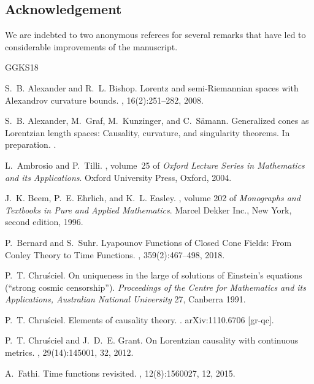 \documentclass[reqno]{amsart}
\numberwithin{equation}{section}
\theoremstyle{plain}
\theoremstyle{definition}
\theoremstyle{remark}
\begin{document}
\subsection*{Acknowledgement} We are indebted to two anonymous referees for several remarks that have led to considerable
improvements of the manuscript.

\begin{thebibliography}{GGKS18}

S.~B. Alexander and R.~L. Bishop.
\newblock Lorentz and semi-{R}iemannian spaces with {A}lexandrov curvature
  bounds.
, 16(2):251--282, 2008.

S.~B. Alexander, M.~Graf, M.~Kunzinger, and C.~S\"amann. 
\newblock Generalized cones as Lorentzian length spaces: Causality, curvature, and singularity theorems. 
\newblock In preparation.
.

L.~Ambrosio and P.~Tilli.
, volume~25 of {\em Oxford
  Lecture Series in Mathematics and its Applications}.
\newblock Oxford University Press, Oxford, 2004.

J.~K. Beem, P.~E. Ehrlich, and K.~L. Easley.
, volume 202 of {\em Monographs and
  Textbooks in Pure and Applied Mathematics}.
\newblock Marcel Dekker Inc., New York, second edition, 1996.

P.~Bernard and S.~Suhr.
\newblock Lyapounov {F}unctions of {C}losed {C}one {F}ields: {F}rom {C}onley
  {T}heory to {T}ime {F}unctions.
, 359(2):467--498, 2018.

P.~T. Chru{\'s}ciel.
On uniqueness in the large of solutions of {E}instein's equations (``strong cosmic censorship'').
{\em Proceedings of the Centre for Mathematics and its Applications, Australian National University}
27, Canberra 1991.

P.~T. Chru{\'s}ciel.
\newblock Elements of causality theory.
.
\newblock arXiv:1110.6706 [gr-qc].

P.~T. Chru{\'s}ciel and J.~D.~E. Grant.
\newblock On {L}orentzian causality with continuous metrics.
, 29(14):145001, 32, 2012.


A.~Fathi.
\newblock Time functions revisited.
, 12(8):1560027, 12, 2015.


\end{thebibliography}
\end{document}
